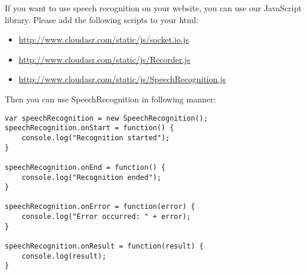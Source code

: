 If you want to use speech recognition on your website, you can use our JavaScript library.
Please add the following scripts to your html:

\begin{itemize}
  \item \url{http://www.cloudasr.com/static/js/socket.io.js}
  \item \url{http://www.cloudasr.com/static/js/Recorder.js}
  \item \url{http://www.cloudasr.com/static/js/SpeechRecognition.js}
\end{itemize}

Then you can use SpeechRecognition in following manner:

\begin{verbatim}
var speechRecognition = new SpeechRecognition();
speechRecognition.onStart = function() {
    console.log("Recognition started");
}

speechRecognition.onEnd = function() {
    console.log("Recognition ended");
}

speechRecognition.onError = function(error) {
    console.log("Error occurred: " + error);
}

speechRecognition.onResult = function(result) {
    console.log(result);
}
\end{verbatim}
